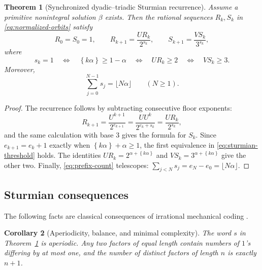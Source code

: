 \documentclass[11pt,oneside]{article}
\newtheorem{theorem}{Theorem}[section]
\newtheorem{corollary}[theorem]{Corollary}
\theoremstyle{definition}
\theoremstyle{remark}
\newcommand{\fract}[1]{\left\{#1\right\}}
\begin{document}
\begin{theorem}[Synchronized dyadic--triadic Sturmian recurrence]\label{thm:sturmian-recurrence}
Assume a primitive nonintegral solution $\beta$ exists.  Then the rational sequences
$R_k,S_k$ in \eqref{eq:normalized-orbits} satisfy
\begin{equation}\label{eq:sturmian-recurrence}
  R_0=S_0=1,
  \qquad
  R_{k+1}=\frac{U R_k}{2^{s_k}},
  \qquad
  S_{k+1}=\frac{V S_k}{3^{s_k}},
\end{equation}
where
\begin{equation}\label{eq:sturmian-threshold}
  s_k=1
  \quad\Longleftrightarrow\quad
  \fract{k\alpha}\ge1-\alpha
  \quad\Longleftrightarrow\quad
  UR_k\ge2
  \quad\Longleftrightarrow\quad
  VS_k\ge3.
\end{equation}
Moreover,
\begin{equation}\label{eq:prefix-count}
  \sum_{j=0}^{N-1}s_j=\lfloor N\alpha\rfloor
  \qquad(N\ge1).
\end{equation}
\end{theorem}

\begin{proof}
The recurrence follows by subtracting consecutive floor exponents:
\[
  R_{k+1}
  =\frac{U^{k+1}}{2^{e_{k+1}}}
  =\frac{U U^k}{2^{e_k+s_k}}
  =\frac{UR_k}{2^{s_k}},
\]
and the same calculation with base $3$ gives the formula for $S_k$.  Since
$e_{k+1}=e_k+1$ exactly when $\fract{k\alpha}+\alpha\ge1$, the first equivalence in
\eqref{eq:sturmian-threshold} holds.  The identities
$UR_k=2^{\alpha+\fract{k\alpha}}$ and
$VS_k=3^{\alpha+\fract{k\alpha}}$ give the other two.  Finally,
\eqref{eq:prefix-count} telescopes:
$\sum_{j<N}s_j=e_N-e_0=\lfloor N\alpha\rfloor$.
\end{proof}

\subsection{Sturmian consequences}

The following facts are classical consequences of irrational mechanical coding
\cite{MorseHedlund1940,Lothaire2002}.

\begin{corollary}[Aperiodicity, balance, and minimal complexity]\label{cor:sturmian}
The word $s$ in Theorem~\ref{thm:sturmian-recurrence} is aperiodic.  Any two factors of equal
length contain numbers of $1$'s differing by at most one, and the number of distinct factors
of length $n$ is exactly $n+1$.
\end{corollary}
\end{document}
